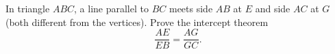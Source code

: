 In triangle $ABC$, a line parallel to $BC$ meets side $AB$ at $E$ and side $AC$ at $G$ (both different from the vertices). Prove the intercept theorem
\[
\dfrac{AE}{EB}=\dfrac{AG}{GC}.
\]
